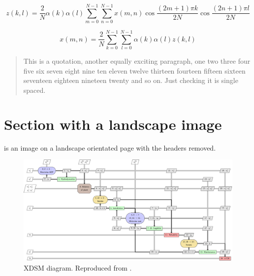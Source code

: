 \begin{equation} \label{eqn:dct}
z(k,l) = \frac{2}{N} \alpha(k) \alpha(l) \sum_{m=0}^{N-1} \sum_{n=0}^{N-1}
         x(m,n) \cos \frac{ (2m+1) \pi k}{2N} \cos \frac{ (2n+1) \pi l}{2N}
\end{equation}

\begin{equation} \label{eqn:idct}
x(m,n) = \frac{2}{N} \sum_{k=0}^{N-1} \sum_{l=0}^{N-1}
         \alpha(k) \alpha(l) z(k,l)
\end{equation}

\begin{quotation}
This is a quotation, another equally exciting paragraph, one two three
four five six seven eight nine ten eleven twelve thirteen fourteen
fifteen sixteen seventeen eighteen nineteen twenty and so on. Just
checking it is single spaced.
\end{quotation}

\section{Section with a landscape image}

 is an image on a landscape orientated page with
the headers removed.

\begin{landscape}
\thispagestyle{empty}
\begin{figure}[p]
  \centering
    \includegraphics[width=\linewidth]{xdsm_sequential-crop}
    \caption{XDSM diagram. Reproduced from \citep{topper2021}.
    \label{fig:landscape}
}
\end{figure}
\end{landscape}
